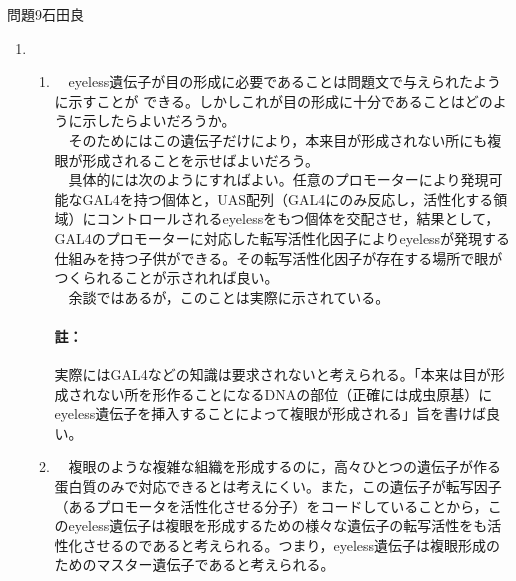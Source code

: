 \documentclass[fleqn]{jbook}
\begin{document}
\begin{answer}{問題9}{石田良}
\begin{enumerate}
\begin{enumerate}
    \item 　神経インパルスが周辺部に広がっていく過程は上の問題で述べた。さて，ここではその伝達が一方向である理由を述べよう。\\
　神経インパルスが伝達する際，細胞膜は脱分極，再分極を経てもとの状態に戻るが，膜が次の活動電位を発生させうる状態になるのには脱分極，再分極を経るだけの時間が必要となる。膜が次の活動電位を発生させうる状態になる前の状態を不活性状態と呼ぶ。\\
　このことにより，今まさに脱分極が起こっている部位は片方向にしかその神経インパルスを伝達できないのである。なぜならほんの少し前に脱分極が起こっていた側は不活性状態になっているので脱分極が引き起こされないからである。
    
\end{enumerate}


  \item 　
  
    \begin{enumerate}
    
    \item 　eyeless遺伝子が目の形成に必要であることは問題文で与えられたように示すことが
できる。しかしこれが目の形成に十分であることはどのように示したらよいだろうか。\\
　そのためにはこの遺伝子だけにより，本来目が形成されない所にも複眼が形成されることを示せばよいだろう。\\
　具体的には次のようにすればよい。任意のプロモーターにより発現可能なGAL4を持つ個体と，UAS配列（GAL4にのみ反応し，活性化する領域）にコントロールされるeyelessをもつ個体を交配させ，結果として，GAL4のプロモーターに対応した転写活性化因子によりeyelessが発現する仕組みを持つ子供ができる。その転写活性化因子が存在する場所で眼がつくられることが示されれば良い。\\
　余談ではあるが，このことは実際に示されている。

\paragraph{註：}実際にはGAL4などの知識は要求されないと考えられる。「本来は目が形成されない所を形作ることになるDNAの部位（正確には成虫原基）にeyeless遺伝子を挿入することによって複眼が形成される」旨を書けば良い。\\
    
    \item 　複眼のような複雑な組織を形成するのに，高々ひとつの遺伝子が作る蛋白質のみで対応できるとは考えにくい。また，この遺伝子が転写因子（あるプロモータを活性化させる分子）をコードしていることから，このeyeless遺伝子は複眼を形成するための様々な遺伝子の転写活性をも活性化させるのであると考えられる。つまり，eyeless遺伝子は複眼形成のためのマスター遺伝子であると考えられる。\\
    
\end{enumerate}
  
\end{enumerate}



\end{answer}
\end{document}

